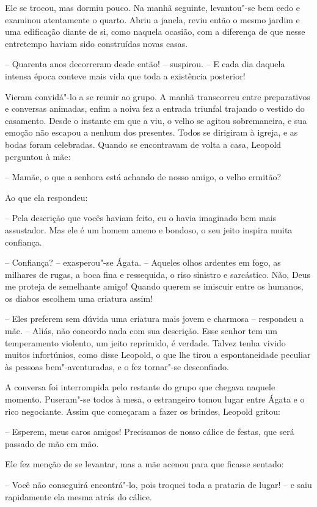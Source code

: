 Ele se trocou, mas dormiu pouco. Na manhã seguinte, levantou"-se bem cedo
e examinou atentamente o quarto. Abriu a janela, reviu então o mesmo
jardim e uma edificação diante de si, como naquela ocasião, com a
diferença de que nesse entretempo haviam sido construídas novas casas. 

 -- Quarenta anos decorreram desde então! -- suspirou. -- E cada dia
daquela intensa época conteve mais vida que toda a existência posterior! 

Vieram convidá"-lo a se reunir ao grupo. A manhã transcorreu entre
preparativos e conversas animadas, enfim a noiva fez a entrada triunfal
trajando o vestido do casamento. Desde o instante em que a viu, o velho
se agitou sobremaneira, e sua emoção não escapou a nenhum dos
presentes. Todos se dirigiram à igreja, e as bodas \mbox{foram} celebradas.
Quando se encontravam de volta a casa, Leopold perguntou à mãe:

-- Mamãe, o que a senhora está achando de nosso amigo, o velho ermitão?

Ao que ela respondeu:

-- Pela descrição que vocês haviam feito, eu o havia imaginado bem
mais assustador. Mas ele é um homem ameno e bondoso, o seu jeito
inspira muita confiança.

-- Confiança? -- exasperou"-se Ágata. -- Aqueles olhos ardentes em fogo,
as milhares de rugas, a boca fina e ressequida, o riso sinistro e
sarcástico. Não, Deus me proteja de semelhante amigo!  Quando querem
se imiscuir entre os humanos, os diabos escolhem uma criatura assim!

-- Eles preferem sem dúvida uma criatura mais jovem e charmosa --
respondeu a mãe. -- Aliás, não concordo nada com sua descrição. Esse
senhor tem um temperamento violento, um jeito reprimido, é verdade.
Talvez tenha vivido muitos infortúnios, como disse Leopold, o que lhe
tirou a espontaneidade peculiar às pessoas bem"-aventuradas, e o fez
tornar"-se desconfiado.

A conversa foi interrompida pelo restante do grupo que chegava naquele
momento. Puseram"-se todos à mesa, o estrangeiro tomou lugar entre Ágata
e o rico negociante. Assim que começaram a fazer os brindes, Leopold gritou:

 -- Esperem, meus caros amigos! Precisamos de nosso cálice de
festas, que será passado de mão em mão.

Ele fez menção de se levantar, mas a mãe acenou para que ficasse
sentado:

-- Você não conseguirá encontrá"-lo, pois troquei toda a prataria de
lugar! -- e saiu rapidamente ela mesma atrás do cálice.

